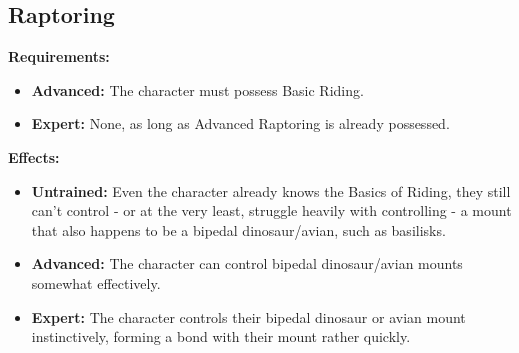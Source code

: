 \subsection{Raptoring}
\begin{table}[!ht]
\centering
{}
\end{table}
\textbf{Requirements:}
\begin{itemize}
	\item \textbf{Advanced:} The character must possess Basic Riding.
	\item \textbf{Expert:} None, as long as Advanced Raptoring is already possessed.
\end{itemize}
\textbf{Effects:}
\begin{itemize}
	\item \textbf{Untrained:} Even the character already knows the Basics of Riding, they still can't control - or at the very least, struggle heavily with controlling - a mount that also happens to be a bipedal dinosaur/avian, such as basilisks.
	\item \textbf{Advanced:} The character can control bipedal dinosaur/avian mounts somewhat effectively.
	\item \textbf{Expert:} The character controls their bipedal dinosaur or avian mount instinctively, forming a bond with their mount rather quickly.
\end{itemize}\newpage
